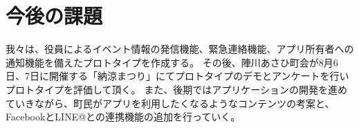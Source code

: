 \section{今後の課題}
我々は、役員によるイベント情報の発信機能、緊急連絡機能、アプリ所有者への通知機能を備えたプロトタイプを作成する。
その後、陣川あさひ町会が8月6日、7日に開催する「納涼まつり」にてプロトタイプのデモとアンケートを行いプロトタイプを評価して頂く。
また、後期ではアプリケーションの開発を進めていきながら、町民がアプリを利用したくなるようなコンテンツの考案と、FacebookとLINE@との連携機能の追加を行っていく。
